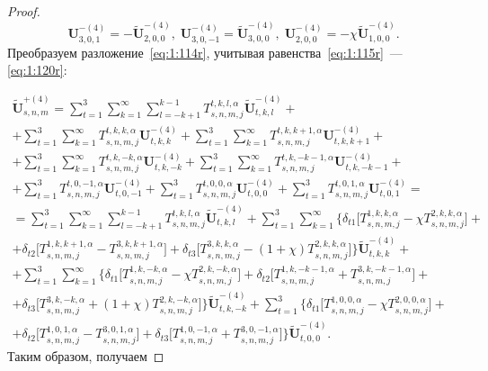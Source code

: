 \begin{proof}
\begin{equation}
\mathbf{U}_{3,0,1}^{-(4)}=-\mathbf{\tilde U}_{2,0,0}^{-(4)},\;\mathbf{U}_{3,0,-1}^{-(4)}=\mathbf{\tilde U}_{3,0,0}^{-(4)},\;\mathbf{U}_{2,0,0}^{-(4)}=-\chi\mathbf{\tilde U}_{1,0,0}^{-(4)}.
\label{eq:1:120r}
\end{equation}
Преобразуем разложение~\eqref{eq:1:114r}, учитывая равенства~\eqref{eq:1:115r}~--- \eqref{eq:1:120r}:

\begin{multline}
\mathbf{\tilde U}_{s,n,m}^{+(4)}=\sum\limits_{t=1}^3\sum\limits_{k=1}^\infty\sum\limits_{l=-k+1}^{k-1}T_{s,n,m,j}^{t,k,l,\alpha}\mathbf{\tilde U}_{t,k,l}^{-(4)}+ \\
+\sum\limits_{t=1}^3\sum\limits_{k=1}^\infty T_{s,n,m,j}^{t,k,k,\alpha}\mathbf{U}_{t,k,k}^{-(4)}+\sum\limits_{t=1}^3\sum\limits_{k=1}^\infty T_{s,n,m,j}^{t,k,k+1,\alpha}\mathbf{U}_{t,k,k+1}^{-(4)}+ \\
+\sum\limits_{t=1}^3\sum\limits_{k=1}^\infty T_{s,n,m,j}^{t,k,-k,\alpha}\mathbf{U}_{t,k,-k}^{-(4)}+\sum\limits_{t=1}^3\sum\limits_{k=1}^\infty T_{s,n,m,j}^{t,k,-k-1,\alpha}\mathbf{U}_{t,k,-k-1}^{-(4)}+ \\
+\sum\limits_{t=1}^3 T_{s,n,m,j}^{t,0,-1,\alpha}\mathbf{U}_{t,0,-1}^{-(4)}+\sum\limits_{t=1}^3 T_{s,n,m,j}^{t,0,0,\alpha}\mathbf{U}_{t,0,0}^{-(4)}+\sum\limits_{t=1}^3 T_{s,n,m,j}^{t,0,1,\alpha}\mathbf{U}_{t,0,1}^{-(4)}= \\
=\sum\limits_{t=1}^3\sum\limits_{k=1}^\infty\sum\limits_{l=-k+1}^{k-1}T_{s,n,m,j}^{t,k,l,\alpha}\mathbf{\tilde U}_{t,k,l}^{-(4)}+\sum\limits_{t=1}^3\sum\limits_{k=1}^\infty\bigg\{\delta_{t1}\bigg\lbrack T_{s,n,m,j}^{1,k,k,\alpha}-\chi T_{s,n,m,j}^{2,k,k,\alpha}\bigg\rbrack+ \\
+\delta_{t2}\bigg\lbrack T_{s,n,m,j}^{1,k,k+1,\alpha}-T_{s,n,m,j}^{3,k,k+1,\alpha}\bigg\rbrack+\delta_{t3}\bigg\lbrack T_{s,n,m,j}^{3,k,k,\alpha}-(1+\chi)T_{s,n,m,j}^{2,k,k,\alpha}\bigg\rbrack\bigg\}\mathbf{\tilde U}_{t,k,k}^{-(4)}+ \\
+\sum\limits_{t=1}^3\sum\limits_{k=1}^\infty\bigg\{\delta_{t1}\bigg\lbrack T_{s,n,m,j}^{1,k,-k,\alpha}-\chi T_{s,n,m,j}^{2,k,-k,\alpha}\bigg\rbrack+\delta_{t2}\bigg\lbrack T_{s,n,m,j}^{1,k,-k-1,\alpha}+T_{s,n,m,j}^{3,k,-k-1,\alpha}\bigg\rbrack+ \\
+\delta_{t3}\bigg\lbrack T_{s,n,m,j}^{3,k,-k,\alpha}+(1+\chi)T_{s,n,m,j}^{2,k,-k,\alpha}\bigg\rbrack\bigg\}\mathbf{\tilde U}_{t,k,-k}^{-(4)}+
\sum\limits_{t=1}^3\bigg\{\delta_{t1}\bigg\lbrack T_{s,n,m,j}^{1,0,0,\alpha}-\chi T_{s,n,m,j}^{2,0,0,\alpha}\bigg\rbrack+ \\
+\delta_{t2}\bigg\lbrack T_{s,n,m,j}^{1,0,1,\alpha}-T_{s,n,m,j}^{3,0,1,\alpha}\bigg\rbrack+\delta_{t3}\bigg\lbrack T_{s,n,m,j}^{1,0,-1,\alpha}+T_{s,n,m,j}^{3,0,-1,\alpha}\bigg\rbrack\bigg\}\mathbf{\tilde U}_{t,0,0}^{-(4)}.
\label{eq:1:121r}
\end{multline}
Таким образом, получаем


\end{proof}
